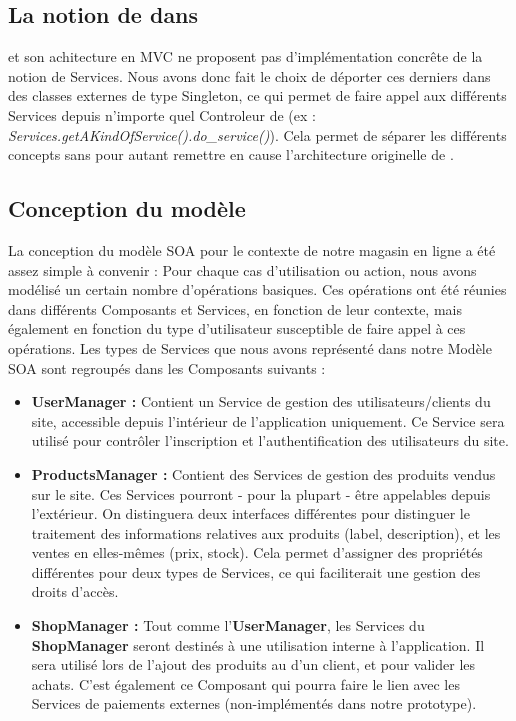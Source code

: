 \subsection{La notion de \kwsoa{} dans \kwplay{}}

\kwplay{} et son achitecture en MVC ne proposent pas d'implémentation concrête de la notion de Services. 
Nous avons donc fait le choix de déporter ces derniers dans des classes externes de type Singleton, ce qui permet de faire appel aux différents Services depuis n'importe quel Controleur de \kwplay{} (ex : \textit{Services.getAKindOfService().do\_service()}).
Cela permet de séparer les différents concepts sans pour autant remettre en cause l'architecture originelle de \kwplay{}.

\subsection{Conception du modèle}

La conception du modèle SOA pour le contexte de notre magasin en ligne a été assez simple à convenir : Pour chaque cas d'utilisation ou action, nous avons modélisé un certain nombre d'opérations basiques. Ces opérations ont été réunies dans différents Composants et Services, en fonction de leur contexte, mais également en fonction du type d'utilisateur susceptible de faire appel à ces opérations.
Les types de Services que nous avons représenté dans notre Modèle SOA sont regroupés dans les Composants suivants :
\begin{itemize}
\item \textbf{UserManager :} Contient un Service de gestion des utilisateurs/clients du site, accessible depuis l'intérieur de l'application uniquement. Ce Service sera utilisé pour contrôler l'inscription et l'authentification des utilisateurs du site.
\item \textbf{ProductsManager :} Contient des Services de gestion des produits vendus sur le site. Ces Services pourront - pour la plupart - être appelables depuis l'extérieur. On distinguera deux interfaces différentes pour distinguer le traitement des informations relatives aux produits (label, description), et les ventes en elles-mêmes (prix, stock). Cela permet d'assigner des propriétés différentes pour deux types de Services, ce qui faciliterait une gestion des droits d'accès.
\item \textbf{ShopManager :} Tout comme l'\textbf{UserManager}, les Services du \textbf{ShopManager} seront destinés à une utilisation interne à l'application. Il sera utilisé lors de l'ajout des produits au  d'un client, et pour valider les achats. C'est également ce Composant qui pourra faire le lien avec les Services de paiements externes (non-implémentés dans notre prototype).
\end{itemize}

